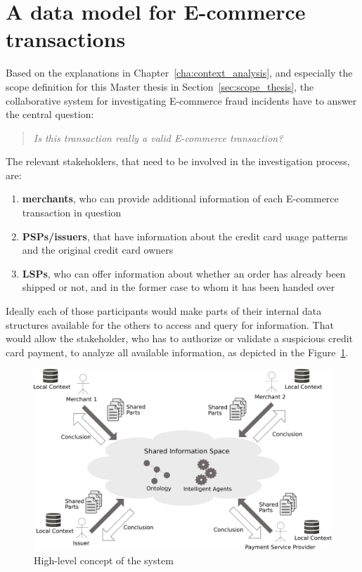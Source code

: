 
\section{A data model for \gls{E-commerce} transactions}
\label{sec:data_model_transactions}

Based on the explanations in Chapter~\ref{cha:context_analysis}, and especially the scope definition for this Master thesis in Section~\ref{sec:scope_thesis}, the collaborative system for investigating \gls{E-commerce} fraud incidents have to answer the central question:\@

\begin{quotation}
  \textit{Is this transaction really a valid \gls{E-commerce} transaction?}
\end{quotation}

The relevant stakeholders, that need to be involved in the investigation process, are:\@

\begin{enumerate}
    \item \textbf{merchants}, who can provide additional information of each \gls{E-commerce} transaction in question
    \item \textbf{\gls{PSP}s/issuers}, that have information about the credit card usage patterns and the original credit card owners
    \item \textbf{\gls{LSP}s}, who can offer information about whether an order has already been shipped or not, and in the former case to whom it has been handed over
\end{enumerate}

Ideally each of those participants would make parts of their internal data structures available for the others to access and query for information. That would allow the stakeholder, who has to authorize or validate a suspicious credit card payment, to analyze all available information, as depicted in the Figure~\ref{fig:images_system_overview}.\@

\begin{figure}[H]
	\centering
		\includegraphics[width=0.9\columnwidth]{images/system_overview.pdf}
	\caption{High-level concept of the system}
\label{fig:images_system_overview}
\end{figure}

